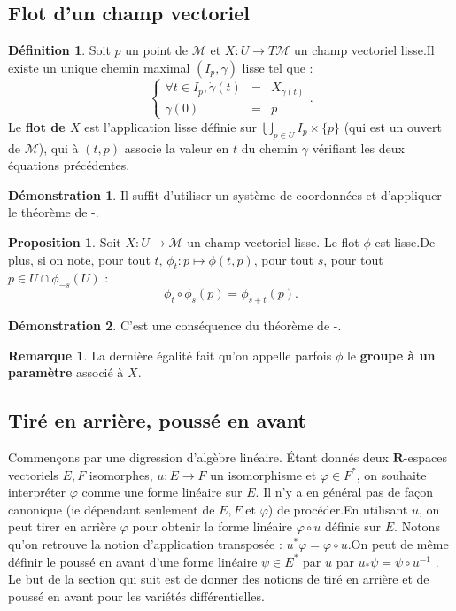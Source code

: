 \documentclass[12pt,a4paper]{article}
\theoremstyle{definition}
\newtheorem{prop}[thm]{Proposition}
\newtheorem{defn}[thm]{Définition}
\newtheorem{rqe}[thm]{Remarque}
\newtheorem*{dem}{Démonstration}
\begin{document}
\subsection{Flot d'un champ vectoriel}
\begin{defn}
Soit $p$ un point de $\mathcal{M}$ et $X:U\to T\mathcal{M}$ un champ vectoriel lisse.\newline Il existe un unique chemin maximal $(I_p,\gamma)$ lisse tel que :
$$\left \{
\begin{array}{rcl}
\forall t\in I_p,\dot{\gamma}(t)&=&X_{\gamma(t)} \\
\gamma(0)&=&p
\end{array}
\right..$$
Le \textbf{flot de $X$} est l'application lisse définie sur $\displaystyle\bigcup_{p\in U}I_p\times\{p\}$ (qui est un ouvert de $\mathcal{M}$), qui à $(t,p)$ associe la valeur en $t$ du chemin $\gamma$ vérifiant les deux équations précédentes.
\end{defn}
\begin{dem}
Il suffit d'utiliser un système de coordonnées et d'appliquer le théorème de -.
\end{dem}
\begin{prop}
Soit $X:U\to\mathcal{M}$ un champ vectoriel lisse. Le flot $\phi$ est lisse.\newline De plus, si on note, pour tout $t$, $\phi_t:p\mapsto\phi(t,p)$, pour tout $s$, pour tout $p\in U\cap\phi_{-s}(U)$ : $$\phi_t\circ\phi_s(p)=\phi_{s+t}(p).$$
\end{prop}
\begin{dem}
C'est une conséquence du théorème de -.
\end{dem}
\begin{rqe}
La dernière égalité fait qu'on appelle parfois $\phi$ le \textbf{groupe à un paramètre} associé à $X$.
\end{rqe}
\newpage
\subsection{Tiré en arrière, poussé en avant}
Commençons par une digression d'algèbre linéaire. Étant donnés deux $\mathbf{R}$-espaces vectoriels $E,F$ isomorphes, $u:E\to F$ un isomorphisme et $\varphi\in F^*$, on souhaite interpréter $\varphi$ comme une forme linéaire sur $E$. Il n'y a en général pas de façon canonique (ie dépendant seulement de $E,F$ et $\varphi$) de procéder.\newline En utilisant $u$, on peut \og tirer en arrière \fg{} $\varphi$ pour obtenir la forme linéaire $\varphi\circ u$ définie sur $E$. Notons qu'on retrouve la notion d'application transposée : $u^*\varphi=\varphi\circ u$.\newline On peut de même définir le \og poussé en avant \fg{} d'une forme linéaire $\psi\in E^*$ par $u$ par $u_*\psi=\psi\circ u^{-1}$ . Le but de la section qui suit est de donner des notions de \og tiré en arrière \fg{} et de \og poussé en avant \fg{} pour les variétés différentielles.  
\end{document}

